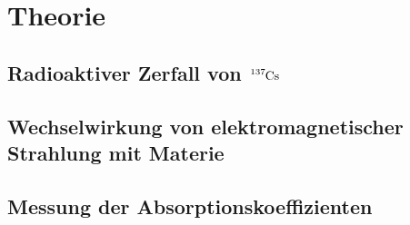 \section{Theorie}
\label{sec:theorie}

\subsection{Radioaktiver Zerfall von $\ce{^{137}Cs}$}

\subsection{Wechselwirkung von elektromagnetischer Strahlung mit Materie}

\subsection{Messung der Absorptionskoeffizienten}
